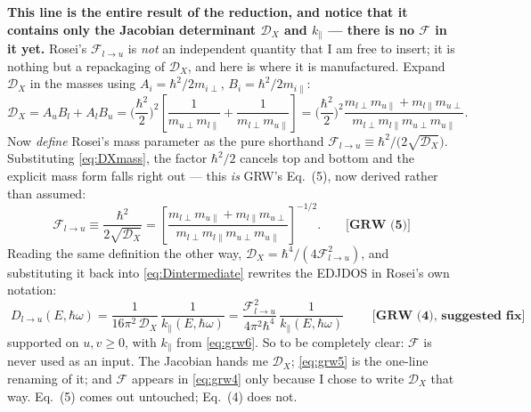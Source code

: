 \documentclass[11pt,a4paper]{article}
\numberwithin{equation}{section}
\newcommand{\hw}{\hbar\omega}
\newcommand{\cD}{\mathcal{D}}
\newcommand{\cF}{\mathcal{F}}
\newcommand{\kpar}{k_{\parallel}}
\newcommand{\grweq}[1]{\textbf{[GRW~(#1)]}}
\newcommand{\grwfix}[1]{\textbf{[GRW~(#1), suggested fix]}}
\begin{document}
\noindent
\textbf{This line is the entire result of the reduction, and notice
that it contains only the Jacobian determinant $\cD_X$ and $\kpar$
--- there is no $\cF$ in it yet.} Rosei's $\cF_{l\to u}$ is \emph{not}
an independent quantity that I am free to insert; it is nothing but a
repackaging of $\cD_X$, and here is where it is manufactured. Expand
$\cD_X$ in the masses using $A_i=\hbar^2/2m_{i\perp}$,
$B_i=\hbar^2/2m_{i\parallel}$:
\begin{equation}
\cD_X=A_uB_l+A_lB_u
=\Big(\frac{\hbar^2}{2}\Big)^{\!2}
 \left[\frac{1}{m_{u\perp}m_{l\parallel}}
      +\frac{1}{m_{l\perp}m_{u\parallel}}\right]
=\Big(\frac{\hbar^2}{2}\Big)^{\!2}
 \frac{m_{l\perp}m_{u\parallel}+m_{l\parallel}m_{u\perp}}
      {m_{l\perp}m_{l\parallel}m_{u\perp}m_{u\parallel}} .
\label{eq:DXmass}
\end{equation}
Now \emph{define} Rosei's mass parameter as the pure shorthand
$\cF_{l\to u}\equiv\hbar^2/\bigl(2\sqrt{\cD_X}\bigr)$. Substituting
\eqref{eq:DXmass}, the factor $\hbar^2/2$ cancels top and bottom and
the explicit mass form falls right out --- this \emph{is} GRW's
Eq.~(5), now derived rather than assumed:
\begin{equation}
\cF_{l\to u}\equiv\frac{\hbar^2}{2\sqrt{\cD_{X}}}
=\left[\frac{m_{l\perp}m_{u\parallel}+m_{l\parallel}m_{u\perp}}
{m_{l\perp}m_{l\parallel}m_{u\perp}m_{u\parallel}}\right]^{-1/2}.
\qquad\grweq{5}
\label{eq:grw5}
\end{equation}
Reading the same definition the other way, $\cD_X=\hbar^4/(4\cF_{l\to
u}^2)$, and substituting it back into \eqref{eq:Dintermediate}
rewrites the EDJDOS in Rosei's own notation:
\begin{equation}
\boxed{\;
D_{l\to u}(E,\hw)
=\frac{1}{16\pi^2\,\cD_{X}}\,\frac{1}{\kpar(E,\hw)}
=\frac{\cF^2_{l\to u}}{4\pi^2\hbar^4}\,\frac{1}{\kpar(E,\hw)}
\;}\qquad\grwfix{4}
\label{eq:grw4}
\end{equation}
supported on $u,v\ge0$, with $\kpar$ from \eqref{eq:grw6}. So to be
completely clear: $\cF$ is never used as an input. The Jacobian hands
me $\cD_X$; \eqref{eq:grw5} is the one-line renaming of it; and $\cF$
appears in \eqref{eq:grw4} only because I chose to write $\cD_X$ that
way. Eq.~(5) comes out untouched; Eq.~(4) does not.
\end{document}
